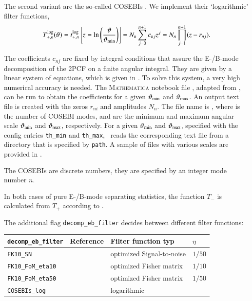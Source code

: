 \documentclass[11pt, chapterprefix, headsepline]{scrartcl}
\begin{document}
The second variant are the so-called COSEBIs \citep[Complete
Orthogonal Sets of E-/B-mode Integrals;][]{COSEBIs}. We implement
their `logarithmic' filter functions,
%
\begin{align}
  T^{\rm log}_{+, n}(\vartheta) = 
  t^{\rm log}_{+, n}\left[z = \ln \left(\frac{\vartheta}{\vartheta_{\rm min}}\right)\right]
  = 
  N_n \sum_{j=0}^{n+1} c_{nj} z^j
  = N_n \prod_{j=1}^{n+1} (z - r_{nj}).
  \label{t}
\end{align}
%
\begin{sloppypar}
The coefficients $c_{nj}$ are fixed by integral conditions that assure
the E-/B-mode decomposition of the 2PCF on a finite angular
integral. They are given by a linear system of equations, which is
given in \cite{COSEBIs}. To solve this system, a very high numerical
accuracy is needed. The \textsc{Mathematica} notebook file
, adapted from \cite{COSEBIs},
can be run to obtain the coefficients for a given $\vartheta_{\rm min}$ and
$\vartheta_{\rm max}$. An output text file is created with the zeros
$r_{ni}$ and amplitudes $N_n$. The file name is
,
where  is the number of COSEBI modes,  and
 are the minimum and maximum angular scale $\vartheta_{\rm min}$
and $\vartheta_{\rm max}$, respectively. For a given $\vartheta_{\rm min}$ and
  $\vartheta_{\rm max}$, specified with the config entries \texttt{th\_min}
  and \texttt{th\_max}, \CosmoPMC\ reads the corresponding text file from a
  directory that is specified by \texttt{path}. A sample of files with
  various scales are provided in .
\end{sloppypar}

The COSEBIs are discrete numbers, they are specified by an integer mode number $n$.

In both cases of pure E-/B-mode separating statistics, the function
$T_-$ is calculated from $T_+$ according to \citet{2002A&A...389..729S}.

The additional flag \texttt{decomp\_eb\_filter} decides between different filter
functions:

\bigskip

\begin{tabular}{llll}
\texttt{decomp\_eb\_filter} & Reference      & Filter function typ  & $\eta$ \\ \hline
\texttt{FK10\_SN}           & \cite{FK10}    & optimized Signal-to-noise & $1/50$ \\
\texttt{FK10\_FoM\_eta10}   & \cite{FK10}    & optimized Fisher matrix   & $1/10$ \\
\texttt{FK10\_FoM\_eta50}   & \cite{FK10}    & optimized Fisher matrix
& $1/50$ \\
\texttt{COSEBIs\_log}       & \cite{COSEBIs} & logarithmic     &
\end{tabular}
\end{document}
